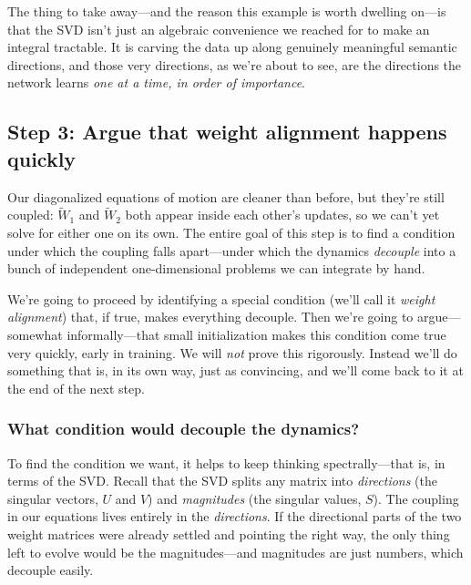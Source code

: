 The thing to take away---and the reason this example is worth dwelling on---is that
the SVD isn't just an algebraic convenience we reached for to make an integral
tractable. It is carving the data up along genuinely meaningful semantic
directions, and those very directions, as we're about to see, are the directions
the network learns \emph{one at a time, in order of importance}.

\subsection{Step 3: Argue that weight alignment happens quickly}

Our diagonalized equations of motion are cleaner than before, but they're still
coupled: $\tilde{W}_1$ and $\tilde{W}_2$ both appear inside each other's updates,
so we can't yet solve for either one on its own. The entire goal of this step is
to find a condition under which the coupling falls apart---under which the
dynamics \emph{decouple} into a bunch of independent one-dimensional problems we
can integrate by hand.

We're going to proceed by identifying a special condition (we'll call it \emph{weight alignment}) that, if true, makes everything decouple. Then we're going to argue---somewhat informally---that small initialization makes
this condition come true very quickly, early in training. We will \emph{not} prove
this rigorously. Instead we'll do something that is, in its own way, just as convincing, and we'll come back to it at the end of the next step.

\subsubsection*{What condition would decouple the dynamics?}

To find the condition we want, it helps to keep thinking spectrally---that is, in
terms of the SVD. Recall that the SVD splits any matrix into \emph{directions}
(the singular vectors, $U$ and $V$) and \emph{magnitudes} (the singular values,
$S$). The coupling in our equations lives entirely in the \emph{directions}. If the directional parts of the two weight matrices were
already settled and pointing the right way, the only thing left to evolve would be
the magnitudes---and magnitudes are just numbers, which decouple easily.


